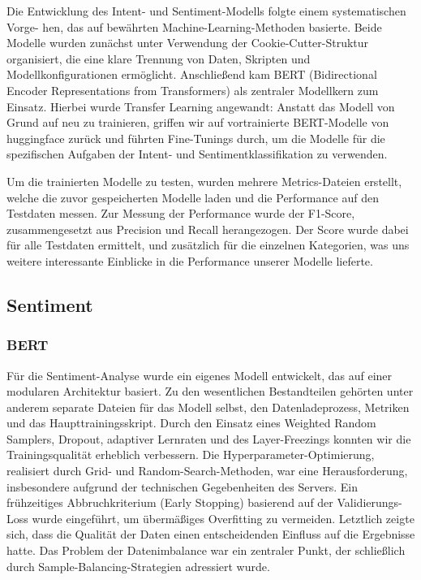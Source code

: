 Die Entwicklung des Intent- und Sentiment-Modells folgte einem systematischen Vorge- hen, 
das auf bewährten Machine-Learning-Methoden basierte. Beide Modelle wurden zunächst unter 
Verwendung der Cookie-Cutter-Struktur organisiert, die eine klare Trennung von Daten, Skripten 
und Modellkonfigurationen ermöglicht. Anschließend kam BERT (Bidirectional Encoder Representations 
from Transformers) als zentraler Modellkern zum Einsatz. Hierbei wurde Transfer Learning angewandt: 
Anstatt das Modell von Grund auf neu zu trainieren, griffen wir auf vortrainierte BERT-Modelle von 
huggingface zurück und führten Fine-Tunings durch, um die Modelle für die spezifischen Aufgaben der 
Intent- und Sentimentklassifikation zu verwenden.

Um die trainierten Modelle zu testen, wurden mehrere Metrics-Dateien erstellt, welche die zuvor 
gespeicherten Modelle laden und die Performance auf den Testdaten messen. Zur Messung der Performance 
wurde der F1-Score, zusammengesetzt aus Precision und Recall herangezogen. Der Score wurde dabei für 
alle Testdaten ermittelt, und zusätzlich für die einzelnen Kategorien, was uns weitere interessante 
Einblicke in die Performance unserer Modelle lieferte.
 

\subsection{Sentiment}
\subsubsection{BERT}

Für die Sentiment-Analyse wurde ein eigenes Modell entwickelt, das auf einer modularen
Architektur basiert. Zu den wesentlichen Bestandteilen gehörten unter anderem separate
Dateien für das Modell selbst, den Datenladeprozess, Metriken und das Haupttrainingsskript.
Durch den Einsatz eines Weighted Random Samplers, Dropout, adaptiver Lernraten und des
Layer-Freezings konnten wir die Trainingsqualität erheblich verbessern. Die
Hyperparameter-Optimierung, realisiert durch Grid- und Random-Search-Methoden, war eine
Herausforderung, insbesondere aufgrund der technischen Gegebenheiten des Servers. Ein
frühzeitiges Abbruchkriterium (Early Stopping) basierend auf der Validierungs-Loss wurde
eingeführt, um übermäßiges Overfitting zu vermeiden. Letztlich zeigte sich, dass die Qualität
der Daten einen entscheidenden Einfluss auf die Ergebnisse hatte. Das Problem der Datenimbalance
war ein zentraler Punkt, der schließlich durch Sample-Balancing-Strategien adressiert wurde. 


